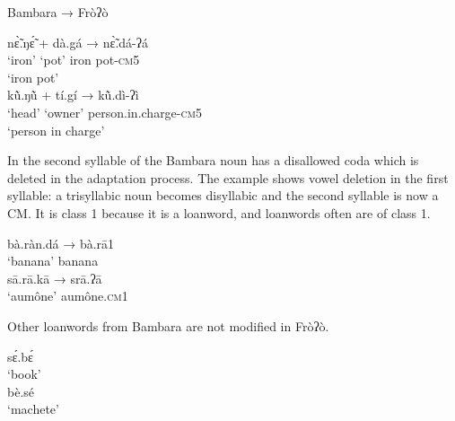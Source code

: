 \documentclass[output=paper]{langscibook}
\begin{document}
\begin{exe}
        \ex Bambara    →    Fròʔò \label{ex:traore:45}\\
        \begin{xlist}
         \ex \gll nɛ̃̀.ŋɛ̃́      +     dà.gá            →           nɛ̃̀.dá-ʔá\\ 
          `iron'    {}        `pot'                   {}    {iron pot-\textsc{cm}5}\\ 
          \trans `iron pot'\\
          \ex  kũ̀.ŋũ̀      +     tí.gí              →         kũ̀.dì-ʔì\\
             `head'    {}       `owner'            {}         person.in.charge-\textsc{cm}5\\
            \trans `person in charge'\\
        \end{xlist}
\end{exe}

In  the second syllable of the Bambara noun has a disallowed coda which is deleted in the adaptation process. The example  shows vowel deletion in the first syllable: a trisyllabic noun becomes disyllabic and the second syllable is now a CM. It is class 1 because it is a loanword, and loanwords often are of class 1.

\begin{exe}
    \ex \label{ex:traore:46}
    \begin{xlist}
        \ex \gll bà.ràn.dá          →          bà.rā1 \label{ex:traore:46a}\\
                `banana'            {}          banana\\
        \ex \gll  sā.rā.kā            →           srā.ʔā \label{ex:traore:46b}\\
                 `aumône'           {}           aumône.\textsc{cm}1\\
    \end{xlist}
 \end{exe}

Other loanwords from Bambara are not modified in Fròʔò.      

\begin{exe}
    \begin{multicols}{2}
        \ex sɛ́.bɛ́ \\
        `book'\\
        \ex bè.sé \\
        `machete'\\
    \end{multicols}
\end{exe}
\end{document}
